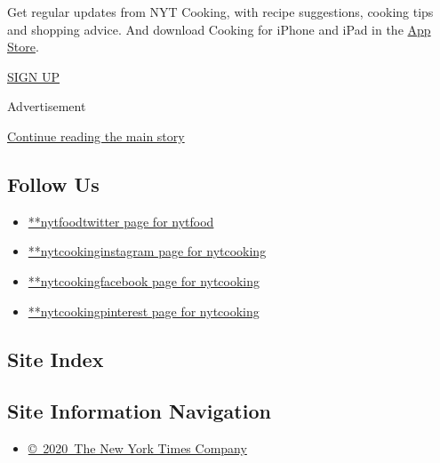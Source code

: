 Get regular updates from NYT Cooking, with recipe suggestions, cooking
tips and shopping advice. And download Cooking for iPhone and iPad in
the
\href{https://itunes.apple.com/us/app/nyt-cooking-recipes-from-new/id911422904?mt=8}{App
Store}.

\href{/newsletters/signup/CK}{SIGN UP}

Advertisement

\protect\hyperlink{after-mktg}{Continue reading the main story}

\hypertarget{follow-us}{%
\subsection{Follow Us}\label{follow-us}}

\begin{itemize}
\tightlist
\item
  \href{https://twitter.com/nytfood}{**nytfoodtwitter page for nytfood}
\item
  \href{https://instagram.com/nytcooking}{**nytcookinginstagram page for
  nytcooking}
\item
  \href{https://www.facebookcorewwwi.onion/nytcooking}{**nytcookingfacebook
  page for nytcooking}
\item
  \href{https://pinterest.com/nytcooking}{**nytcookingpinterest page for
  nytcooking}
\end{itemize}

\hypertarget{site-index}{%
\subsection{Site Index}\label{site-index}}

\hypertarget{site-information-navigation}{%
\subsection{Site Information
Navigation}\label{site-information-navigation}}

\begin{itemize}
\tightlist
\item
  \href{https://help.nytimes3xbfgragh.onion/hc/en-us/articles/115014792127-Copyright-notice}{©~2020~The
  New York Times Company}
\end{itemize}

